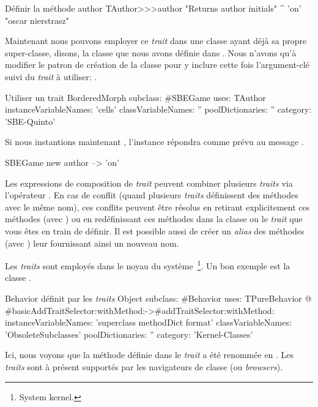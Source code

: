 \documentclass[a4paper,10pt,twoside]{book}
\begin{document}
\begin{method}[author]{D\'efinir la m\'ethode author}
TAuthor>>>author
    "Returns author initials"
	^ 'on'    "oscar nierstrasz"
\end{method}

\noindent
Maintenant nous pouvons employer ce \emph{trait} dans une classe ayant d\'ej\`a sa propre super-classe, disons, la classe  que nous avons d\'efinie dans .
Nous n'avons qu'\`a modifier le patron de cr\'eation de la classe  pour y inclure cette fois l'argument-cl\'e  suivi du \emph{trait} \`a utiliser: .

\begin{classdef}[sbegamewithtrait]{Utiliser un trait}
BorderedMorph subclass: #SBEGame
	uses: TAuthor
	instanceVariableNames: 'cells'
	classVariableNames: ''
	poolDictionaries: ''
	category: 'SBE-Quinto'
\end{classdef}

Si nous instantions maintenant , l'instance r\'epondra comme pr\'evu au message .

\begin{code}{}
SBEGame new author --> 'on'
\end{code}

Les expressions de composition de \emph{trait} peuvent combiner plusieurs \emph{traits} via l'op\'erateur \ct{+}.
En cas de conflit (\ie quand plusieurs \emph{traits} d\'efinissent des m\'ethodes avec le m\^eme nom), ces conflits peuvent \^etre r\'esolus en retirant explicitement ces m\'ethodes (avec \ct{-}) ou en red\'efinissant ces m\'ethodes dans la classe ou le \emph{trait} que vous \^etes en train de d\'efinir.
Il est possible aussi de cr\'eer un \emph{alias} des m\'ethodes (avec ) 
leur fournissant ainsi un nouveau nom.

Les \emph{traits} sont employ\'es dans le noyau du syst\`eme~\footnote{System kernel.}.
Un bon exemple est la classe .

\begin{classdef}[behaviorwithtraits]{Behavior d\'efinit par les \emph{traits}}
Object subclass: #Behavior
	uses: TPureBehavior @ {#basicAddTraitSelector:withMethod:->#addTraitSelector:withMethod:}
	instanceVariableNames: 'superclass methodDict format'
	classVariableNames: 'ObsoleteSubclasses'
	poolDictionaries: ''
	category: 'Kernel-Classes'
\end{classdef}
\noindent
Ici, nous voyons que la m\'ethode  d\'efinie dans le \emph{trait}  a \'et\'e renomm\'ee en \mbox{.}
Les \emph{traits} sont \`a pr\'esent support\'es par les navigateurs de classe (ou \emph{browsers}).
\end{document}
